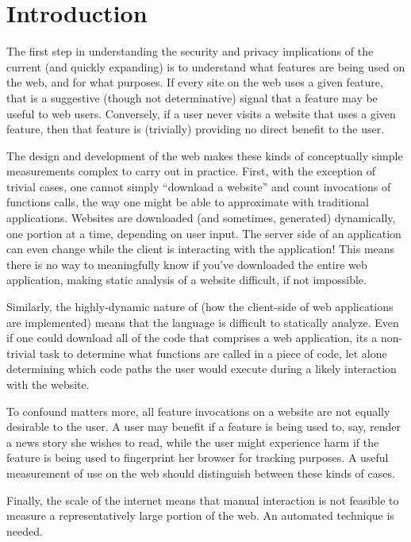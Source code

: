 \section{Introduction}
\label{measurement:overview}

The first step in understanding the security and privacy implications
of the current (and quickly expanding) \WAPI is to understand what features
are being used on the web, and for what purposes.  If every site on the
web uses a given \WAPI feature, that is a suggestive (though not determinative)
signal that a feature may be useful to web users.  Conversely, if a user
never visits a website that uses a given \WAPI feature, then that feature
is (trivially) providing no direct benefit to the user.

The design and development of the web makes these kinds of conceptually simple
measurements complex to carry out in practice.  First, with the exception of
trivial cases, one cannot simply ``download a website'' and count invocations
of functions calls, the way one might be able to approximate with traditional
applications.  Websites are downloaded (and sometimes, generated) dynamically,
one portion at a time, depending on user input. The server side of an
application can even change while the client is interacting with the
application!  This means there is no way to meaningfully know if
you've downloaded the entire web application, making static analysis of a
website difficult, if not impossible.

Similarly, the highly-dynamic nature of \JS (how the client-side of web
applications are implemented) means that the language is difficult to
statically analyze. Even if one could download all of the \JS code that
comprises a web application, its a non-trivial task to determine what \WAPI
functions are called in a piece of code, let alone determining which code paths
the user would execute during a likely interaction with the website.

To confound matters more, all feature invocations on a website are not equally
desirable to the user.  A user may benefit if a feature is being used to, say,
render a news story she wishes to read, while the user might experience harm
if the feature is being used to fingerprint her browser for tracking purposes.
A useful measurement of \WAPI use on the web should distinguish between these
kinds of cases.

Finally, the scale of the internet means that manual interaction is not
feasible to measure a representatively large portion of the web.  An automated
technique is needed.

